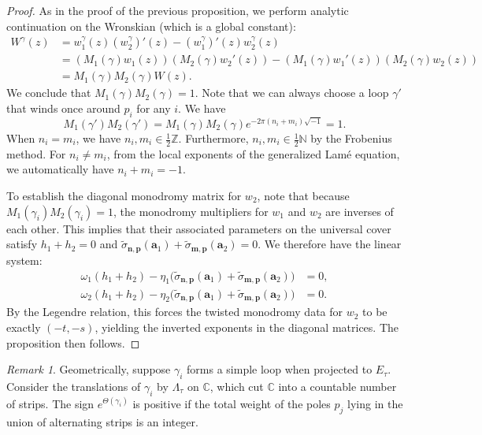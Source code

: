 \documentclass[11pt]{amsart}
\theoremstyle{remark}
\newtheorem{remark}[theorem]{Remark}
\numberwithin{equation}{section}
\begin{document}
\begin{proof}
As in the proof of the previous proposition, we perform analytic continuation on the Wronskian (which is a global constant):
\[
\begin{split}
    W^\gamma(z) &= w_1^\gamma(z) (w_2^\gamma)'(z) - (w_1^\gamma)'(z) w_2^\gamma(z) \\
    &= (M_1(\gamma) w_1(z))(M_2(\gamma) w_2'(z)) - (M_1(\gamma) w_1'(z))(M_2(\gamma) w_2(z)) \\
    &= M_1(\gamma) M_2(\gamma) W(z).
\end{split}
\]
We conclude that $M_1(\gamma)M_2(\gamma) =1$. Note that we can always choose a loop $\gamma'$ that winds once around $p_i$ for any $i$. We have
\[
    M_1(\gamma') M_2(\gamma') = M_1(\gamma) M_2(\gamma) e^{-2\pi (n_i+m_i)\sqrt{-1} } =1.
\]
When $n_i =m_i$, we have $n_i,m_i \in \tfrac{1}{2}\mathbb{Z}$. Furthermore, $n_i,m_i \in \tfrac{1}{2}\mathbb{N}$ by the Frobenius method. For $n_i\neq m_i$, from the local exponents of the generalized Lam\'e equation, we automatically have $n_i+m_i = -1$.

To establish the diagonal monodromy matrix for $w_2$, note that because $M_1(\gamma_i) M_2(\gamma_i) = 1$, the monodromy multipliers for $w_1$ and $w_2$ are inverses of each other. This implies that their associated parameters on the universal cover satisfy $h_1 + h_2 = 0$ and $\widetilde{\sigma}_{\mathbf{n},\mathbf{p}}(\mathbf{a}_1) + \widetilde{\sigma}_{\mathbf{m},\mathbf{p}}(\mathbf{a}_2) = 0$. We therefore have the linear system: 
\[
\begin{split}
\omega_1( h_1 + h_2 ) - \eta_1 \big(\widetilde{\sigma}_{\mathbf{n},\mathbf{p}}(\mathbf{a}_1) + \widetilde{\sigma}_{\mathbf{m},\mathbf{p}}(\mathbf{a}_2) \big) &= 0,
\\
\omega_2(h_1 + h_2 ) - \eta_2 \big( \widetilde{\sigma}_{\mathbf{n},\mathbf{p}}(\mathbf{a}_1) + \widetilde{\sigma}_{\mathbf{m},\mathbf{p}}(\mathbf{a}_2) \big) &= 0.
\end{split}
\]
By the Legendre relation, this forces the twisted monodromy data for $w_2$ to be exactly $(-t, -s)$, yielding the inverted exponents in the diagonal matrices. The proposition then follows.
\end{proof}

\begin{remark}
Geometrically, suppose $\gamma_i$ forms a simple loop when projected to $E_\tau$. Consider the translations of $\gamma_i$ by $\Lambda_\tau$ on $\mathbb{C}$, which cut $\mathbb{C}$ into a countable number of strips. The sign $e^{\Theta(\gamma_i)}$ is positive if the total weight of the poles $p_j$ lying in the union of alternating strips is an integer.
\end{remark}
\end{document}
